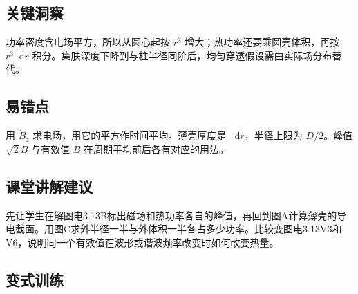 \documentclass[UTF8,fontset=fandol,a4paper,11pt]{ctexart}
\newcommand{\dd}{\mathop{}\!\mathrm{d}}
\begin{document}


\subsection*{关键洞察}

功率密度含电场平方，所以从圆心起按 $r^2$ 增大；热功率还要乘圆壳体积，再按 $r^3\dd r$ 积分。集肤深度下降到与柱半径同阶后，均匀穿透假设需由实际场分布替代。



\subsection*{易错点}

用 $\dot B_z$ 求电场，用它的平方作时间平均。薄壳厚度是 $\dd r$，半径上限为 $D/2$。峰值 $\sqrt2B$ 与有效值 $B$ 在周期平均前后各有对应的用法。



\subsection*{课堂讲解建议}

先让学生在解图电3.13B标出磁场和热功率各自的峰值，再回到图A计算薄壳的导电截面。用图C求外半径一半与外体积一半各占多少功率。比较变图电3.13V3和V6，说明同一个有效值在波形或谐波频率改变时如何改变热量。


\subsection*{变式训练}
\end{document}
